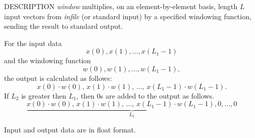 \begin{qsection}{DESCRIPTION}
{\em window} multiplies, 
on an element-by-element basis, 
length $L$ input vectors from {\em infile} (or standard input) 
by a specified windowing function, 
sending the result to standard output.

For the input data
\begin{displaymath}
  x(0), x(1), \dots, x(L_1-1)
\end{displaymath}
and the windowing function
\begin{displaymath}
  w(0), w(1), \dots, w(L_1-1), 
\end{displaymath}
the output is calculated as follows:
\begin{displaymath}
  x(0)\cdot w(0),\,x(1)\cdot w(1),\,\dots,\,x(L_1-1)\cdot w(L_1-1). 
\end{displaymath}
If $L_2$ is greater then $L_1$, then 0s are added to the output as follows.
\begin{displaymath}
  \underbrace{x(0)\cdot w(0),\,x(1)\cdot w(1),\,\dots,\,x(L_1-1)\cdot w(L_1-1),0,\dots,0}_{L_2}
\end{displaymath}

Input and output data are in float format.
\end{qsection}

\begin{options}
\end{options}

